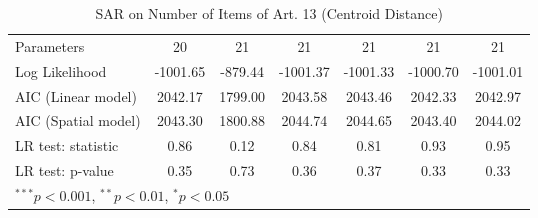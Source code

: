 \begin{table}[!h]
\begin{center}
\begin{tabular}{l c c c c c c }
Parameters              & 20           & 21           & 21           & 21           & 21           & 21           \\
Log Likelihood          & -1001.65     & -879.44      & -1001.37     & -1001.33     & -1000.70     & -1001.01     \\
AIC (Linear model)      & 2042.17      & 1799.00      & 2043.58      & 2043.46      & 2042.33      & 2042.97      \\
AIC (Spatial model)     & 2043.30      & 1800.88      & 2044.74      & 2044.65      & 2043.40      & 2044.02      \\
LR test: statistic      & 0.86         & 0.12         & 0.84         & 0.81         & 0.93         & 0.95         \\
LR test: p-value        & 0.35         & 0.73         & 0.36         & 0.37         & 0.33         & 0.33         \\
\bottomrule
\multicolumn{7}{l}{\scriptsize{$^{***}p<0.001$, $^{**}p<0.01$, $^*p<0.05$}}
\end{tabular}
\caption{SAR on Number of Items of Art. 13 (Centroid Distance)}
\label{table:coefficients}
\end{center}
\end{table}
